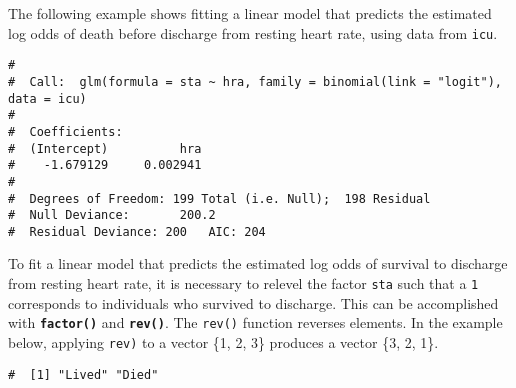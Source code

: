 \documentclass[letterpaper,12pt,twoside,]{pinp}
\begin{document}
The following example shows fitting a linear model that predicts the
estimated log odds of death before discharge from resting heart rate,
using data from \texttt{icu}.

\begin{Shaded}
\begin{Highlighting}[]
\NormalTok{(}\NormalTok{)}

\OperatorTok{~}\StringTok{ } \NormalTok{(} \NormalTok{))}
\end{Highlighting}
\end{Shaded}

\begin{ShadedResult}
\begin{verbatim}
#  
#  Call:  glm(formula = sta ~ hra, family = binomial(link = "logit"), data = icu)
#  
#  Coefficients:
#  (Intercept)          hra  
#    -1.679129     0.002941  
#  
#  Degrees of Freedom: 199 Total (i.e. Null);  198 Residual
#  Null Deviance:       200.2 
#  Residual Deviance: 200   AIC: 204
\end{verbatim}
\end{ShadedResult}

To fit a linear model that predicts the estimated log odds of survival
to discharge from resting heart rate, it is necessary to relevel the
factor \texttt{sta} such that a \texttt{1} corresponds to individuals
who survived to discharge. This can be accomplished with
\textbf{\texttt{factor()}} and \textbf{\texttt{rev()}}. The
\texttt{rev()} function reverses elements. In the example below,
applying \texttt{rev)} to a vector \{1, 2, 3\} produces a vector \{3, 2,
1\}.

\begin{Shaded}
\begin{Highlighting}[]
\OperatorTok{$}
\end{Highlighting}
\end{Shaded}

\begin{ShadedResult}
\begin{verbatim}
#  [1] "Lived" "Died"
\end{verbatim}
\end{ShadedResult}
\end{document}
